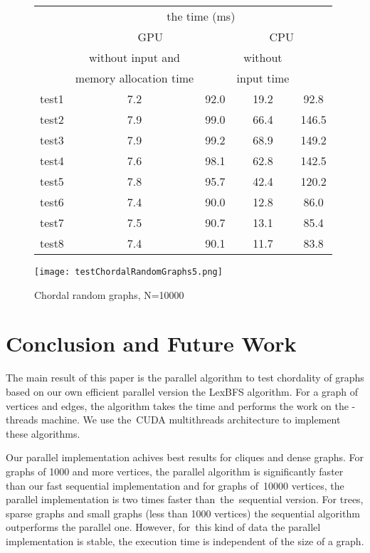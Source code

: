 \documentclass[a4paper, 11pt]{article}
\begin{document}
\begin{figure}[h!]
    \caption{Chordal random graphs, N=10000}
    \begin{center}
    \begin{tabular}{|r|c|c|c|c|}
        \hline
        & \multicolumn{4}{|c|}{the time (ms)}\\
        \cline{2-5}
        & \multicolumn{2}{|c|}{GPU} & \multicolumn{2}{|c|}{CPU}\\
        \cline{2-5}
            & without input and &  & without & \\
           & memory allocation time&  & input time & \\
        \hline
        test1 & 7.2 &  92.0 & 19.2 & 92.8\\
        test2 & 7.9 &  99.0 & 66.4 & 146.5\\
        test3 & 7.9 &  99.2 & 68.9 & 149.2\\
        test4 & 7.6 &  98.1 & 62.8 & 142.5\\
        test5 & 7.8 &  95.7 & 42.4 & 120.2\\
        test6 & 7.4 &  90.0 & 12.8 & 86.0\\
        test7 & 7.5 &  90.7 & 13.1 & 85.4\\
        test8 & 7.4 &  90.1 & 11.7 & 83.8\\
        \hline
    \end{tabular}
\texttt{[image: testChordalRandomGraphs5.png]}
    \end{center}
\end{figure}


\section{Conclusion and Future Work}

The main result of this paper is the parallel algorithm to test chordality of graphs 
based on our own efficient parallel version the LexBFS algorithm. For a graph  of 
 vertices and  edges, the algorithm takes the  time and performs the  
work on the -threads machine. We use the~CUDA multithreads architecture to implement 
these algorithms.

Our parallel implementation achives best results for cliques and dense graphs. For 
graphs of 1000 and more vertices, the parallel algorithm is significantly faster 
than our fast sequential implementation and for graphs of~10000 vertices, the parallel 
implementation is two times faster than~the~sequential version. For trees, sparse graphs 
and small graphs (less than 1000 vertices) the sequential algorithm outperforms the
parallel one. However, for~this kind of data the parallel implementation is stable, 
the execution time is independent of the size of a graph.
\end{document}
